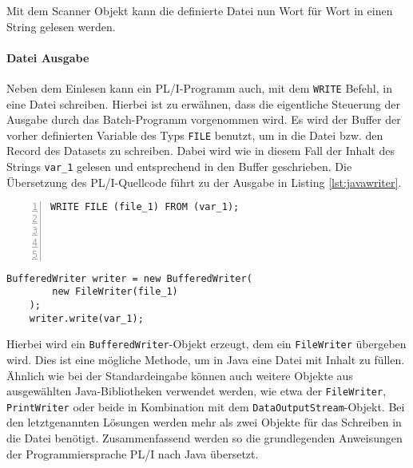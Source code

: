 Mit dem Scanner Objekt kann die definierte Datei nun Wort für Wort in einen String gelesen werden.

\paragraph*{Datei Ausgabe}

Neben dem Einlesen kann ein PL/I-Programm auch, mit dem \verb+WRITE+ Befehl, in eine Datei schreiben. Hierbei ist zu erwähnen, dass die eigentliche Steuerung der Ausgabe durch das Batch-Programm vorgenommen wird.
Es wird der Buffer der vorher definierten Variable des Typs \verb+FILE+ benutzt, um in die Datei bzw. den Record
des Datasets zu schreiben. Dabei wird wie in diesem Fall der Inhalt des Strings \verb+var_1+ gelesen und entsprechend
in den Buffer geschrieben.
Die Übersetzung des PL/I-Quellcode führt zu der Ausgabe in Listing \ref{lst:javawriter}.

\begin{minipage}[b]{0.48\linewidth}
	\centering
	\lstset{language=PL/I,label=SliceExaple}
	\begin{lstlisting}[frame=single, numbers=left, mathescape,%
		caption={Transformation Dateiausgabe}, label={lst:javawriter},  basicstyle=\fontsize{9}{13}\selectfont\ttfamily]
	WRITE FILE (file_1) FROM (var_1);	
	
	
	
	
	\end{lstlisting}
\end{minipage}
\hspace{0.5cm}
\begin{minipage}[b]{0.48\linewidth}
	\centering
	\lstset{language=Java,label=SliceExaple}
	\begin{lstlisting}[frame=single, mathescape,%
		title={" "},  basicstyle=\fontsize{9}{13}\selectfont\ttfamily]
	BufferedWriter writer = new BufferedWriter(
		new FileWriter(file_1)
	); 
	writer.write(var_1);
	\end{lstlisting}
\end{minipage}  

Hierbei wird ein \verb+BufferedWriter+-Objekt erzeugt, dem ein \verb+FileWriter+ übergeben wird. Dies ist eine mögliche Methode, um in Java eine Datei mit Inhalt zu füllen. Ähnlich wie bei der Standardeingabe können auch weitere Objekte aus ausgewählten Java-Bibliotheken verwendet werden, wie etwa der \verb+FileWriter+, \verb+PrintWriter+ oder beide in Kombination mit dem \verb+DataOutputStream+-Objekt. Bei den letztgenannten Lösungen werden mehr als zwei Objekte für das Schreiben in die Datei benötigt.
Zusammenfassend werden so die grundlegenden Anweisungen der Programmiersprache PL/I nach Java übersetzt. 

